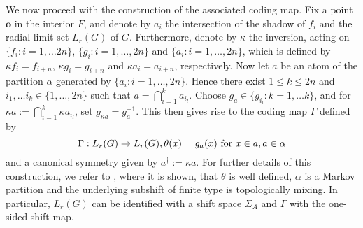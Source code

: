 \documentclass[10pt]{article}
\theoremstyle{mystyle}
\newcommand{\te}{{\theta}}
\newcommand{\Sig}{{\Sigma}}
\newcommand{\1}{\mathbf{1}}
\begin{document}
We now proceed with the construction of the associated coding map. Fix a point  $\mathbf{o}$ in the interior $F$, and denote by $a_i$ the intersection of the shadow of $f_i$ and the radial limit set $L_r(G)$ of $G$. 
Furthermore, denote by $\kappa$ the inversion, acting on $\{f_i:i=1,\ldots 2n\}$, $\{g_i:i=1,\ldots, 2n\}$ and $\{a_i:i=1,\ldots, 2n\}$, which is defined by $\kappa f_i=f_{i+n}$, $\kappa g_i=g_{i+n}$ and $\kappa a_i=a_{i+n}$, respectively. Now let $a$ be an atom of the partition $\alpha$ generated by $\{a_i:i=1,\ldots ,2n\}$. Hence there exist $1 \leq k\leq 2n$ and $i_1, \ldots i_k \in \{1, \ldots, 2n\}$ such that $a = \bigcap_{i=1}^k a_{i_l}$. Choose $g_a \in \{g_{i_l}: k= 1,\ldots k\}$, and for $\kappa a:= \bigcap_{i=1}^k \kappa a_{i_l}$, set $g_{\kappa a} = g_a^{-1}$. This then gives rise to the coding map $\Gamma$ defined by 
\[\Gamma: L_r(G) \to L_r(G), \te(x)=g_a(x) \hbox{ for } x \in a, a \in \alpha\]
and a canonical symmetry given by $a^\dagger:=\kappa a$. 
For further details of this construction, we refer to \cite{StadlbauerStratmann:2005}, where it is shown, that $\te$ is well defined,  $\alpha$ is a Markov partition and  the underlying subshift of finite type is topologically mixing. In particular, $L_r(G)$ can be identified with a shift space $\Sig_A$ and $\Gamma$ with the one-sided shift map.
\end{document}
